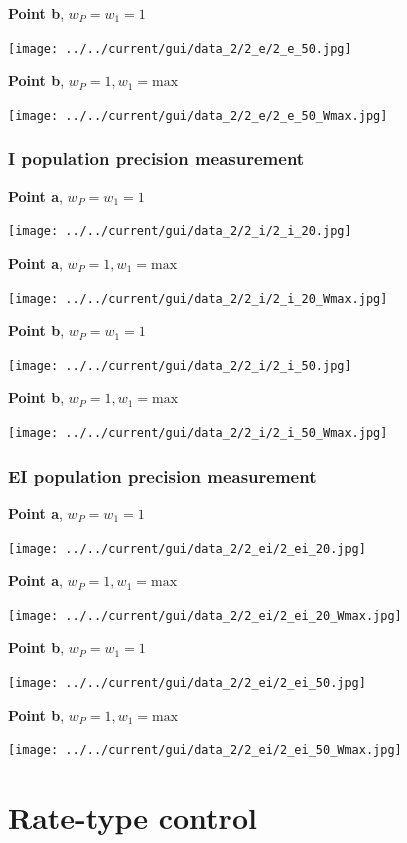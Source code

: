 \documentclass[]{article}
\begin{document}
\textbf{Point b}, $w_P = w_1 = 1$

\texttt{[image: ../../current/gui/data\_2/2\_e/2\_e\_50.jpg]}
\newpage

\textbf{Point b}, $w_P = 1, w_1 = \text{max}$

\texttt{[image: ../../current/gui/data\_2/2\_e/2\_e\_50\_Wmax.jpg]}
\newpage

\subsubsection{I population precision measurement}

\textbf{Point a}, $w_P = w_1 = 1$

\texttt{[image: ../../current/gui/data\_2/2\_i/2\_i\_20.jpg]}
\newpage

\textbf{Point a}, $w_P = 1, w_1 = \text{max}$

\texttt{[image: ../../current/gui/data\_2/2\_i/2\_i\_20\_Wmax.jpg]}
\newpage

\textbf{Point b}, $w_P = w_1 = 1$

\texttt{[image: ../../current/gui/data\_2/2\_i/2\_i\_50.jpg]}
\newpage

\textbf{Point b}, $w_P = 1, w_1 = \text{max}$

\texttt{[image: ../../current/gui/data\_2/2\_i/2\_i\_50\_Wmax.jpg]}
\newpage

\subsubsection{EI population precision measurement}

\textbf{Point a}, $w_P = w_1 = 1$

\texttt{[image: ../../current/gui/data\_2/2\_ei/2\_ei\_20.jpg]}
\newpage

\textbf{Point a}, $w_P = 1, w_1 = \text{max}$

\texttt{[image: ../../current/gui/data\_2/2\_ei/2\_ei\_20\_Wmax.jpg]}
\newpage

\textbf{Point b}, $w_P = w_1 = 1$

\texttt{[image: ../../current/gui/data\_2/2\_ei/2\_ei\_50.jpg]}
\newpage

\textbf{Point b}, $w_P = 1, w_1 = \text{max}$

\texttt{[image: ../../current/gui/data\_2/2\_ei/2\_ei\_50\_Wmax.jpg]}
\newpage

\section{Rate-type control}
\bigskip
\end{document}
